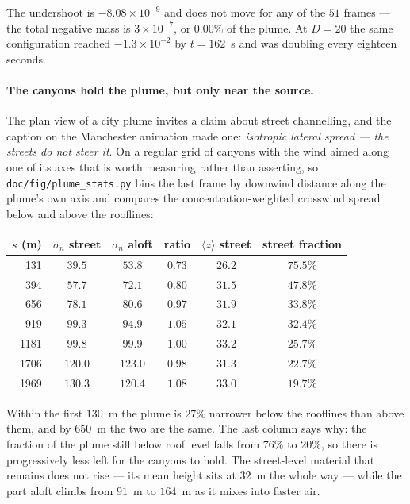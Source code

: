 \documentclass[11pt,a4paper]{article}
\begin{document}
The undershoot is $-8.08\times10^{-9}$ and does not move for any of the $51$
frames --- the total negative mass is $3\times10^{-7}$, or $0.00\%$ of the plume.
At $D=20$ the same configuration reached $-1.3\times10^{-2}$ by $t=162$~s and was
doubling every eighteen seconds.

\paragraph{The canyons hold the plume, but only near the source.} The plan view
of a city plume invites a claim about street channelling, and the caption on the
Manchester animation made one: \emph{isotropic lateral spread --- the streets do
not steer it}. On a regular grid of canyons with the wind aimed along one of its
axes that is worth measuring rather than asserting, so
\texttt{doc/fig/plume\_stats.py} bins the last frame by downwind distance along
the plume's own axis and compares the concentration-weighted crosswind spread
below and above the rooflines:

\begin{center}
\begin{tabular}{rccccc}
\toprule
$s$ (m) & $\sigma_n$ street & $\sigma_n$ aloft & ratio &
$\langle z\rangle$ street & street fraction \\
\midrule
 131 & $39.5$  & $53.8$  & $0.73$ & $26.2$ & $75.5\%$ \\
 394 & $57.7$  & $72.1$  & $0.80$ & $31.5$ & $47.8\%$ \\
 656 & $78.1$  & $80.6$  & $0.97$ & $31.9$ & $33.8\%$ \\
 919 & $99.3$  & $94.9$  & $1.05$ & $32.1$ & $32.4\%$ \\
1181 & $99.8$  & $99.9$  & $1.00$ & $33.2$ & $25.7\%$ \\
1706 & $120.0$ & $123.0$ & $0.98$ & $31.3$ & $22.7\%$ \\
1969 & $130.3$ & $120.4$ & $1.08$ & $33.0$ & $19.7\%$ \\
\bottomrule
\end{tabular}
\end{center}

\noindent Within the first $130$~m the plume is $27\%$ narrower below the
rooflines than above them, and by $650$~m the two are the same. The last column
says why: the fraction of the plume still below roof level falls from $76\%$ to
$20\%$, so there is progressively less left for the canyons to hold. The
street-level material that remains does not rise --- its mean height sits at
$32$~m the whole way --- while the part aloft climbs from $91$~m to $164$~m as it
mixes into faster air.
\end{document}
